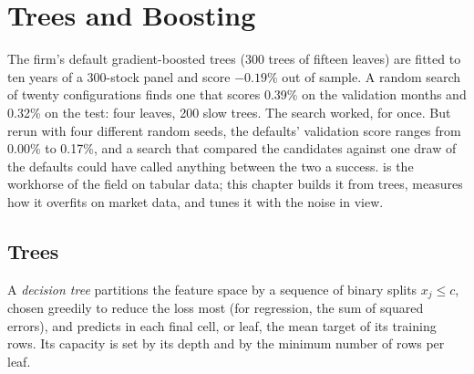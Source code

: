 \chapter{Trees and Boosting}\label{ch:ml:trees-and-boosting}

The firm's default gradient-boosted trees (300 trees of fifteen leaves) are fitted to ten years of a 300-stock panel
and score $-0.19\%$ out of sample. A random search of twenty configurations finds one that scores 0.39\% on the
validation months and 0.32\% on the test: four leaves, 200 slow trees. The search worked, for once. But rerun with four
different random seeds, the defaults' validation score ranges from 0.00\% to 0.17\%, and a search that compared the
candidates against one draw of the defaults could have called anything between the two a success.  is
the workhorse of the field on tabular data; this chapter builds it from trees, measures how it overfits on market data,
and tunes it with the noise in view.

\section{Trees}

\begin{definition}\label{def:ml:trees-and-boosting:tree}
A \emph{decision tree} partitions the feature space by a sequence of binary splits $x_j\le c$,
chosen greedily to reduce the loss most (for regression, the sum of squared errors), and predicts in each final cell,
or leaf, the mean target of its training rows. Its capacity is set by its depth and by the minimum number of rows per
leaf.
\end{definition}

\begin{omfigure}

\label{fig:ml:trees:tree}
\end{omfigure}

